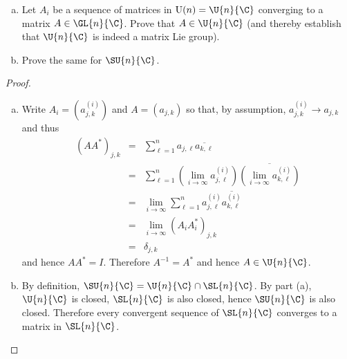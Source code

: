 \documentclass[10pt]{amsart}
\begin{document}
\begin{ex}\label{thm1}
  \begin{enumerate}[(a)]
  \item
    Let $A_i$ be a sequence of matrices in $\operatorname{U}(n) = \U{n}{\C}$ converging to a matrix $A \in \GL{n}{\C}$.
    Prove that $A \in \U{n}{\C}$ (and thereby establish that $\U{n}{\C}$ is indeed a matrix Lie group).
  \item
    Prove the same for $\SU{n}{\C}$.
  \end{enumerate}
  \begin{proof}
    \begin{enumerate}[(a)]
    \item
      Write $A_i = \left(a_{j,k}^{(i)}\right)$ and $A = \left(a_{j,k}\right)$ so that, by assumption, $a_{j,k}^{(i)} \rightarrow a_{j,k}$ and thus
      \begin{eqnarray*}
        (AA^*)_{j,k} &=& \sum_{\ell = 1}^n a_{j,\ell}\overline{a_{k,\ell}}\\
        &=& \sum_{\ell = 1}^n \left(\lim_{i \rightarrow \infty}a_{j,\ell}^{(i)}\right)\overline{\left(\lim_{i \rightarrow \infty}a_{k,\ell}^{(i)}\right)}\\
        &=& \lim_{i \rightarrow \infty}\sum_{\ell = 1}^n a_{j,\ell}^{(i)}\overline{a_{k,\ell}^{(i)}}\\
        &=& \lim_{i \rightarrow \infty} (A_iA_i^*)_{j,k}\\
        &=& \delta_{j,k}
      \end{eqnarray*}
      and hence $AA^* = I$.
      Therefore $A^{-1} = A^*$ and hence $A \in \U{n}{\C}$.
    \item
      By definition, $\SU{n}{\C} = \U{n}{\C} \cap \SL{n}{\C}$.
      By part (a), $\U{n}{\C}$ is closed, $\SL{n}{\C}$ is also closed, hence $\SU{n}{\C}$ is also closed.
      Therefore every convergent sequence of $\SL{n}{\C}$ converges to a matrix in $\SL{n}{\C}$.
    \end{enumerate}
  \end{proof}
\end{ex}
\end{document}
